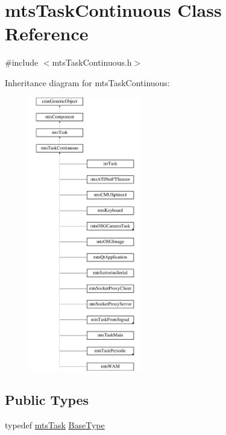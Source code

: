 \hypertarget{classmts_task_continuous}{\section{mts\-Task\-Continuous Class Reference}
\label{classmts_task_continuous}
}


{\ttfamily \#include $<$mts\-Task\-Continuous.\-h$>$}

Inheritance diagram for mts\-Task\-Continuous\-:\begin{figure}[H]
\begin{center}
\leavevmode
\includegraphics[height=12.000000cm]{d2/d8b/classmts_task_continuous}
\end{center}
\end{figure}
\subsection*{Public Types}
\begin{DoxyCompactItemize}
\item 
typedef \hyperlink{classmts_task}{mts\-Task} \hyperlink{classmts_task_continuous_ab1c75a7d5ac83cba5bc21ebd4a31d804}{Base\-Type}
\end{DoxyCompactItemize}
